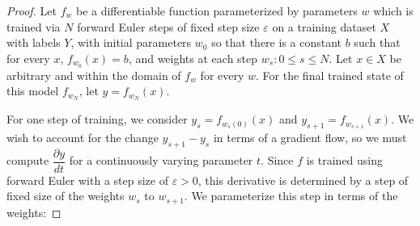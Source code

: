 \begin{proof}

Let $f_{w}$ be a differentiable function parameterized by parameters $w$ which is trained via $N$ forward Euler steps of fixed step size $\varepsilon$ on a training dataset $X$ with labels $ Y$, with initial parameters $w_0$ so that there is a constant $b$ such that for every $x$, $f_{w_0}(x) = b$, and weights at each step ${w_s : 0 \leq s \leq N}$. Let $x \in X$ be arbitrary and within the domain of $f_w$ for every $w$. For the final trained state of this model $f_{w_N}$, let $y = f_{w_N}(x)$. 

For one step of training, we consider $y_s  = f_{w_s(0)}(x)$ and $y_{s+1} = f_{w_{s+1}}(x)$. We wish to account for the change $y_{s+1} - y_s$ in terms of a gradient flow, so we must compute $\dfrac{\partial y}{dt}$ for a continuously varying parameter $t$. Since $f$ is trained using forward Euler with a step size of $\varepsilon > 0$, this derivative is determined by a step of fixed size of the weights $w_s$ to $w_{s+1}$. We parameterize this step in terms of the weights:


\end{proof}
